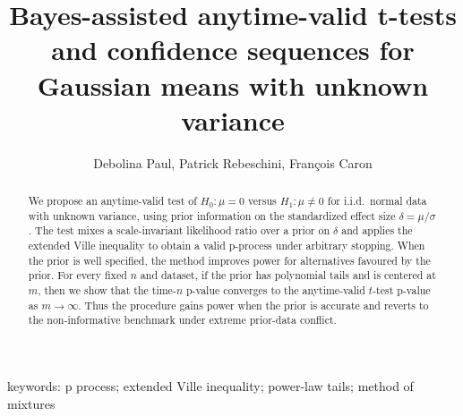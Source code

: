 \documentclass{article}%
\newcommand{\1}{\mathbf{1}}
\begin{document}
\title{Bayes-assisted anytime-valid t-tests and confidence sequences for Gaussian means with unknown variance}
\author{Debolina Paul, Patrick Rebeschini, Fran\c{c}ois Caron}
\maketitle

\begin{abstract}

We propose an anytime-valid test of $H_0:\mu=0$ versus $H_1:\mu\neq 0$ for i.i.d.\ normal data with unknown variance, using prior information on the standardized effect size $\delta=\mu/\sigma$. The test mixes a scale-invariant likelihood ratio over a prior on $\delta$ and applies the extended Ville inequality to obtain a valid p-process under arbitrary stopping. When the prior is well specified, the method improves power for alternatives favoured by the prior. For every fixed $n$ and dataset, if the prior has polynomial tails and is centered at $m$, then we show that the time-$n$ p-value converges to the anytime-valid $t$-test p-value as $m\to\infty$. Thus the procedure gains power when the prior is accurate and reverts to the non-informative benchmark under extreme prior-data conflict.

\end{abstract}

keywords: p process; extended Ville inequality; power-law tails; method of mixtures 
\end{document}
